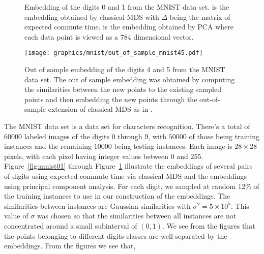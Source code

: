 \begin{figure}[htbp]
  \begin{center}
  \caption{Embedding of the digits 0 and 1 from the MNIST data
    set.  is the embedding obtained by
    classical MDS with $\Delta$ being the matrix of expected commute
    time.  is the embedding obtained by
    PCA where each data point is viewed as a $784$ dimensional vector.
    }
  \label{fig:mnist17}
  \end{center}
\end{figure}    
\begin{figure}[htbp]
  \begin{center}
    \texttt{[image: graphics/mnist/out\_of\_sample\_mnist45.pdf]}
    \caption{Out of sample embedding of the digits 4 and 5 from the MNIST data
    set. The out of sample embedding was obtained by computing the
    similarities between the new points to the existing sampled points
    and then embedding the new points through the out-of-sample extension of
    classical MDS as in \cite{bengio04:_out_lle_isomap_mds_eigen}.}  
  \label{fig:out_of_sample_mnist45}
  \end{center}
\end{figure} 
The MNIST data set \citep{lecun98:_gradien} is a data set for
characters recognition. There's a total of $60000$ labeled images of
the digits $0$ through $9$, with $50000$ of those being training
instances and the remaining $10000$ being testing instances. Each
image is $28 \times 28$ pixels, with each pixel having integer values
between $0$ and $255$. Figure~\ref{fig:mnist01} through
Figure~\ref{fig:mnist17} illustrate the embeddings of several pairs of
digits using expected commute time via classical MDS and the
embeddings using principal component analysis. For each digit, we
sampled at random $12$\% of the training instances to use in our
construction of the embeddings. The similarities between instances are
Gaussian similarities with $\sigma^2 = 5 \times 10^5$. This value of
$\sigma$ was chosen so that the similarities between all instances are
not concentrated around a small subinterval of $(0,1)$. We see from
the figures that the points belonging to different digits classes are
well separated by the embeddings. From the figures we see that,
